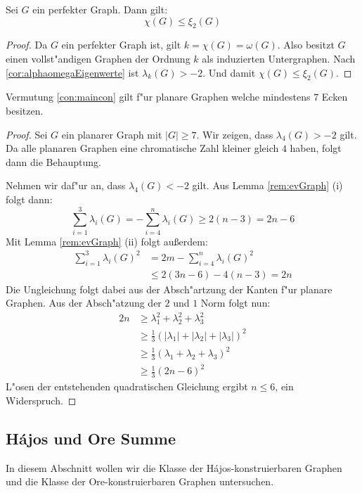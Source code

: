 \begin{proposition}
  Sei $G$ ein perfekter Graph. Dann gilt:
  $$\chi(G) \leq \xi_{2}(G)$$
\end{proposition}

\begin{proof}
  Da $G$ ein perfekter Graph ist, gilt $k = \chi(G) = \omega(G)$. Also besitzt $G$ einen vollst"andigen Graphen der Ordnung $k$ als induzierten Untergraphen. Nach \ref{cor:alphaomegaEigenwerte} ist $\lambda_{k}(G) > -2$. Und damit $\chi(G) \leq \xi_{2}(G)$.
\end{proof}

\begin{proposition}
  Vermutung \ref{con:maincon} gilt f"ur planare Graphen welche mindestens $7$ Ecken besitzen.
\end{proposition}

\begin{proof}
  Sei $G$ ein planarer Graph mit $|G| \geq 7$.
  Wir zeigen, dass $\lambda_4(G) > -2$ gilt. Da alle planaren Graphen eine chromatische Zahl kleiner gleich $4$ haben, folgt dann die Behauptung.

  Nehmen wir daf"ur an, dass $\lambda_{4}(G) < -2$ gilt.
  Aus Lemma \ref{rem:evGraph} (i) folgt dann:
  \begin{equation*}
    \sum\limits_{i=1}^3 \lambda_{i}(G) = -\sum\limits_{i=4}^{n}\lambda_{i}(G) \geq 2 (n-3) = 2n-6
  \end{equation*}
  Mit Lemma \ref{rem:evGraph} (ii) folgt au{\ss}erdem:
  \begin{align*}
    \sum\limits_{i=1}^3 \lambda_{i}(G)^{2} &= 2m -\sum\limits_{i=4}^{n}\lambda_{i}(G)^{2} \\
    &\leq 2(3n-6) -4(n-3) = 2n
  \end{align*}
  Die Ungleichung folgt dabei aus der Absch"artzung der Kanten f"ur planare Graphen. Aus der Absch"atzung der $2$ und $1$ Norm folgt nun:
  \begin{align*}
    2n &\geq \lambda_{1}^{2} +\lambda_{2}^{2} +\lambda_{3}^{2}  \\ &\geq \frac{1}{3} (|\lambda_{1}| + |\lambda_2| + |\lambda_3|)^{2} \\
    &\geq \frac{1}{3}(\lambda_{1}+ \lambda_2 + \lambda_3)^{2}\\ &\geq \frac{1}{3}(2n-6)^{2}
  \end{align*}
  L"osen der entstehenden quadratischen Gleichung ergibt $n\leq 6$, ein Widerspruch.
\end{proof} 
\subsection{H\'ajos und Ore Summe}
In diesem Abschnitt wollen wir die Klasse der H\'ajos-konstruierbaren Graphen und die Klasse der Ore-konstruierbaren Graphen untersuchen. 

